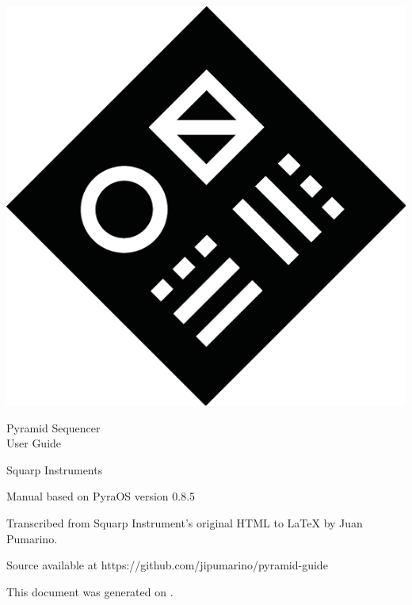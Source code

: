 \thispagestyle{coverpagestyle}
\vspace*{\fill}
\begin{center}
\includegraphics{figs/squarplogo.png}

\fontsize{30}{30}\futurafont
Pyramid Sequencer\\
User Guide

\fontsize{18}{18}\futurafont
Squarp Instruments
\end{center}
\vspace*{\fill}

\newpage
\thispagestyle{coverpagestyle}

\vspace*{\fill}

Manual based on PyraOS version 0.8.5

Transcribed from Squarp Instrument's original HTML to \LaTeX{} by Juan Pumarino.

Source available at https://github.com/jipumarino/pyramid-guide

This document was generated on \DTMnow.

\vspace*{\fill}

\newpage
